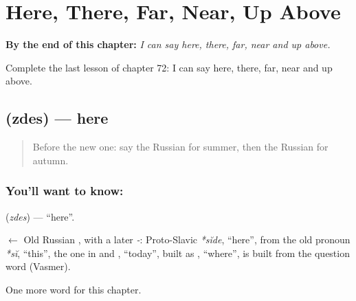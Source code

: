 
\chapter{Here, There, Far, Near, Up Above}
\label{ch:ru-here-there-far-near-up-above}

\begin{chapteropening}
\textbf{By the end of this chapter:} \emph{I can say here, there, far, near and up above.}

Complete the last lesson of chapter 72: I can say here, there, far, near and up above.
\end{chapteropening}

\section[\texorpdfstring{\ru{здесь} (zdes)}{здесь (zdes)}]{ (zdes) — here}

\label{lesson:RU-C72-here}



\begin{quote}
Before the new one: say the Russian for summer, then the Russian for autumn.
\end{quote}

\subsection*{You'll want to know: }
\textbf{} (\emph{zdes}) — \textquotedblleft{}here\textquotedblright{}.

\begin{cousinweb}
\textbf{} $\leftarrow$ Old Russian \emph{}, with a later \emph{-}: Proto-Slavic \emph{*sĭde}, \textquotedblleft{}here\textquotedblright{}, from the old pronoun \emph{*sĭ}, \textquotedblleft{}this\textquotedblright{}, the one in \emph{} and \emph{}, \textquotedblleft{}today\textquotedblright{}, built as \emph{}, \textquotedblleft{}where\textquotedblright{}, is built from the question word (Vasmer).
\end{cousinweb}

\begin{grammarlens}[title={What you've built}]
One more word for this chapter.
\end{grammarlens}

